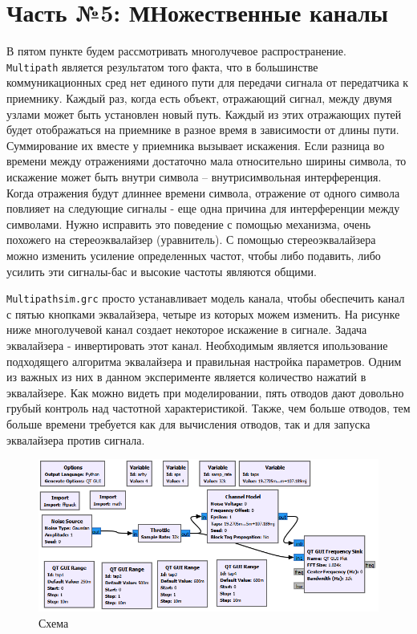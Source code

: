 \documentclass[a4paper]{article}
\begin{document}
    \newpage
        \section{Часть №5: МНожественные каналы}
            В пятом пункте будем рассмотривать многолучевое распространение. \\\texttt{Multipath} является результатом того факта, что в большинстве коммуникационных сред нет единого пути для передачи сигнала от передатчика к приемнику. Каждый раз, когда есть объект, отражающий сигнал, между двумя узлами может быть установлен новый путь. Каждый из этих отражающих путей будет отображаться на приемнике в разное время в зависимости от длины пути. Суммирование их вместе у приемника вызывает искажения. Если разница во времени между отражениями достаточно мала относительно ширины символа, то искажение может быть внутри символа – внутрисимвольная интерференция. Когда отражения будут длиннее времени символа, отражение от одного символа повлияет на следующие сигналы - еще одна причина для интерференции между символами. Нужно исправить это поведение с помощью механизма, очень похожего на стереоэквалайзер (уравнитель). С помощью стереоэквалайзера можно изменить усиление определенных частот, чтобы либо подавить, либо усилить эти сигналы-бас и высокие частоты являются общими.
            
            \texttt{Multipathsim.grc} просто устанавливает модель канала, чтобы обеспечить канал с пятью кнопками эквалайзера, четыре из которых можем изменить. На рисунке ниже многолучевой канал создает некоторое искажение в сигнале. Задача эквалайзера - инвертировать этот канал. Необходимым является ипользование подходящего алгоритма эквалайзера и правильная настройка параметров. Одним из важных из них в данном эксперименте является количество нажатий в эквалайзере. Как можно видеть при моделировании, пять отводов дают довольно грубый контроль над частотной характеристикой. Также, чем больше отводов, тем больше времени требуется как для вычисления отводов, так и для запуска эквалайзера против сигнала.
            
            \begin{figure}[H]
                \centering
                \includegraphics[width=\textwidth]{img/p5_1.png}
                \caption{Схема}
                \label{fig:p5_1}
            \end{figure}
            
\end{document}
